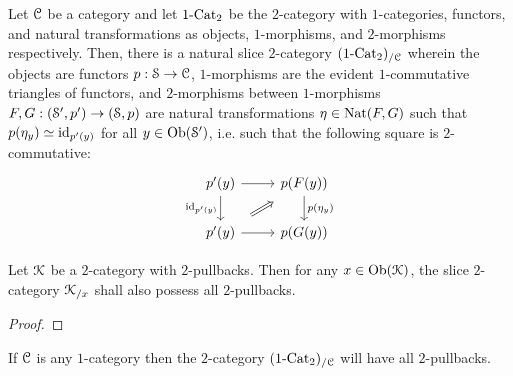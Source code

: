             \begin{example} \label{example: over_categories}
                Let $\C$ be a category and let $1\-\Cat_2$ be the $2$-category with $1$-categories, functors, and natural transformations as objects, $1$-morphisms, and $2$-morphisms respectively. Then, there is a natural slice $2$-category $(1\-\Cat_2)_{/\C}$ wherein the objects are functors $p: \S \to \C$, $1$-morphisms are the evident $1$-commutative triangles of functors, and $2$-morphisms between $1$-morphisms $F, G: (\S', p') \to (\S, p)$ are natural transformations $\eta \in \Nat(F, G)$ such that $p(\eta_y) \cong \id_{p'(y)}$ for all $y \in \Ob(\S')$, i.e. such that the following square is $2$-commutative:
                    $$
                        \begin{tikzcd}
                        	{p'(y)} & {p(F(y))} \\
                        	{p'(y)} & {p(G(y))}
                        	\arrow["{p(\eta_y)}", from=1-2, to=2-2]
                        	\arrow[from=1-1, to=1-2]
                        	\arrow["{\id_{p'(y)}}"', from=1-1, to=2-1]
                        	\arrow[from=2-1, to=2-2]
                        	\arrow[shorten <=8pt, shorten >=8pt, Rightarrow, from=2-1, to=1-2]
                        \end{tikzcd}
                    $$
            \end{example}
            \begin{proposition} \label{prop: 2_pullbacks_in_slice_2_categories}
                Let $\calK$ be a $2$-category with $2$-pullbacks. Then for any $x \in \Ob(\calK)$, the slice $2$-category $\calK_{/x}$ shall also possess all $2$-pullbacks.
            \end{proposition}
                \begin{proof}
                            
                \end{proof}
            \begin{corollary} \label{coro: 2_pullbacks_of_over_categories}
                If $\C$ is any $1$-category then the $2$-category $(1\-\Cat_2)_{/\C}$ will have all $2$-pullbacks.
            \end{corollary}
            
